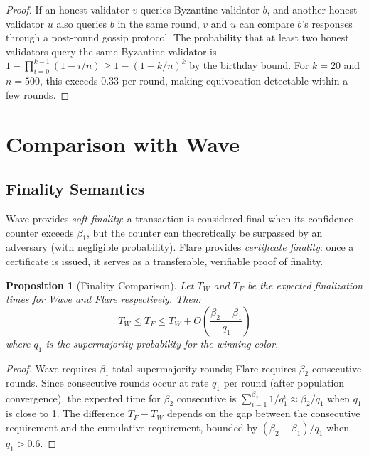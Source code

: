 \documentclass[11pt,a4paper]{article}
\newtheorem{proposition}[theorem]{Proposition}
\begin{document}
\begin{proof}
If an honest validator $v$ queries Byzantine validator $b$, and another honest validator
$u$ also queries $b$ in the same round, $v$ and $u$ can compare $b$'s responses through
a post-round gossip protocol. The probability that at least two honest validators query
the same Byzantine validator is $1 - \prod_{i=0}^{k-1}(1 - i/n) \geq 1 - (1-k/n)^k$
by the birthday bound. For $k = 20$ and $n = 500$, this exceeds 0.33 per round, making
equivocation detectable within a few rounds.
\end{proof}

\section{Comparison with Wave}
\label{sec:comparison}

\subsection{Finality Semantics}

Wave provides \emph{soft finality}: a transaction is considered final when its confidence
counter exceeds $\beta_1$, but the counter can theoretically be surpassed by an adversary
(with negligible probability). Flare provides \emph{certificate finality}: once a
certificate is issued, it serves as a transferable, verifiable proof of finality.

\begin{proposition}[Finality Comparison]
\label{prop:finality}
Let $T_W$ and $T_F$ be the expected finalization times for Wave and Flare respectively.
Then:
\[
T_W \leq T_F \leq T_W + O\left(\frac{\beta_2 - \beta_1}{q_1}\right)
\]
where $q_1$ is the supermajority probability for the winning color.
\end{proposition}

\begin{proof}
Wave requires $\beta_1$ total supermajority rounds; Flare requires $\beta_2$ consecutive
rounds. Since consecutive rounds occur at rate $q_1$ per round (after population
convergence), the expected time for $\beta_2$ consecutive is $\sum_{i=1}^{\beta_2} 1/q_1^i
\approx \beta_2/q_1$ when $q_1$ is close to 1. The difference $T_F - T_W$ depends on
the gap between the consecutive requirement and the cumulative requirement, bounded by
$(\beta_2 - \beta_1)/q_1$ when $q_1 > 0.6$.
\end{proof}
\end{document}
